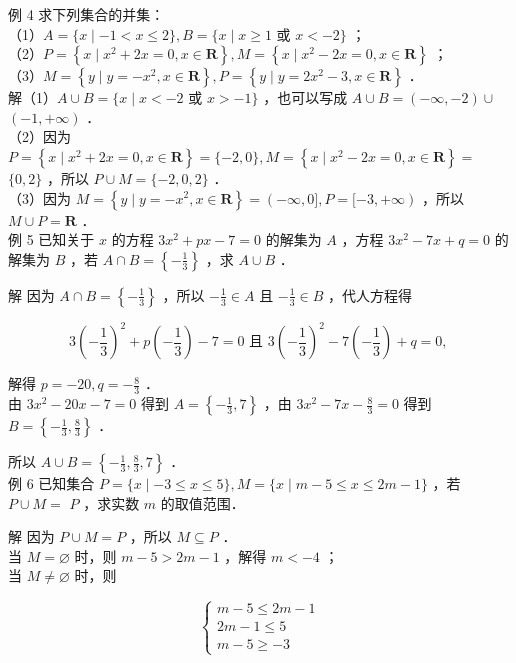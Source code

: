 \documentclass[10pt]{article}
\begin{document}
例 4 求下列集合的并集：\\
（1）\(A=\{x \mid-1<x \leqslant 2\}, B=\{x \mid x \geqslant 1\) 或 \(x<-2\}\) ；\\
（2）\(P=\left\{x \mid x^{2}+2 x=0, x \in \mathbf{R}\right\}, M=\left\{x \mid x^{2}-2 x=0, x \in \mathbf{R}\right\}\) ；\\
（3）\(M=\left\{y \mid y=-x^{2}, x \in \mathbf{R}\right\}, P=\left\{y \mid y=2 x^{2}-3, x \in \mathbf{R}\right\}\) ．\\
解（1）\(A \cup B=\{x \mid x<-2\) 或 \(x>-1\}\) ，也可以写成 \(A \cup B=(-\infty,-2) \cup\) \((-1,+\infty)\) ．\\
（2）因为 \(P=\left\{x \mid x^{2}+2 x=0, x \in \mathbf{R}\right\}=\{-2,0\}, M=\left\{x \mid x^{2}-2 x=0, x \in \mathbf{R}\right\}=\) \(\{0,2\}\) ，所以 \(P \cup M=\{-2,0,2\}\) ．\\
（3）因为 \(M=\left\{y \mid y=-x^{2}, x \in \mathbf{R}\right\}=(-\infty, 0], P=[-3,+\infty)\) ，所以 \(M \cup P=\mathbf{R}\) ．\\
例 5 已知关于 \(x\) 的方程 \(3 x^{2}+p x-7=0\) 的解集为 \(A\) ，方程 \(3 x^{2}-7 x+q=0\) 的解集为 \(B\) ，若 \(A \cap B=\left\{-\frac{1}{3}\right\}\) ，求 \(A \cup B\) ．

解 因为 \(A \cap B=\left\{-\frac{1}{3}\right\}\) ，所以 \(-\frac{1}{3} \in A\) 且 \(-\frac{1}{3} \in B\) ，代人方程得

\[
3\left(-\frac{1}{3}\right)^{2}+p\left(-\frac{1}{3}\right)-7=0 \text { 且 } 3\left(-\frac{1}{3}\right)^{2}-7\left(-\frac{1}{3}\right)+q=0 \text {, }
\]

解得 \(p=-20, q=-\frac{8}{3}\) ．\\
由 \(3 x^{2}-20 x-7=0\) 得到 \(A=\left\{-\frac{1}{3}, 7\right\}\) ，由 \(3 x^{2}-7 x-\frac{8}{3}=0\) 得到 \(B=\left\{-\frac{1}{3}, \frac{8}{3}\right\}\) ．

所以 \(A \cup B=\left\{-\frac{1}{3}, \frac{8}{3}, 7\right\}\) ．\\
例 6 已知集合 \(P=\{x \mid-3 \leqslant x \leqslant 5\}, M=\{x \mid m-5 \leqslant x \leqslant 2 m-1\}\) ，若 \(P \cup M=\) \(P\) ，求实数 \(m\) 的取值范围．

解 因为 \(P \cup M=P\) ，所以 \(M \subseteq P\) ．\\
当 \(M=\varnothing\) 时，则 \(m-5>2 m-1\) ，解得 \(m<-4\) ；\\
当 \(M \neq \varnothing\) 时，则

\[
\left\{\begin{array}{l}
m-5 \leqslant 2 m-1 \\
2 m-1 \leqslant 5 \\
m-5 \geqslant-3
\end{array}\right.
\]
\end{document}
